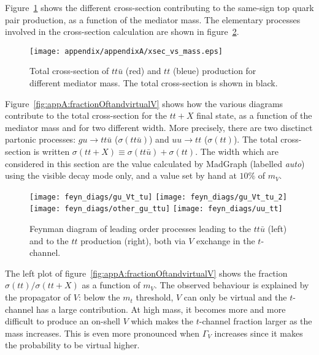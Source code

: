 \label{sec:appA}
       
Figure~\ref{fig:appA:allxsec} shows the different cross-section contributing to the same-sign top quark pair production, as a function of the mediator mass. The elementary processes
involved in the cross-section calculation are shown in figure~\ref{fig:appA:feyn_prod_ss_all}.

\begin{figure}[!h!tpd]
  \centering    
  \texttt{[image: appendix/appendixA/xsec\_vs\_mass.eps]}
  \caption{
    Total cross-section of $tt\bar{u}$ (red) and $tt$ (bleue) production for different mediator mass. The total cross-section is shown in black.
  }
  \label{fig:appA:allxsec}
\end{figure}



Figure~\ref{fig:appA:fractionOftandvirtualV} shows how the various diagrams contribute to the total cross-section for the $tt+X$ final state, 
as a function of the mediator mass and for two different width. More precisely, there are two disctinct partonic 
processes: $gu \to tt\bar{u}$ ($\sigma(tt\bar{u})$) and $uu \to tt$ ($\sigma(tt)$). The total cross-section is written $\sigma(tt+X) \equiv \sigma(tt\bar{u}) + \sigma(tt)$.
The width which are considered in this section are the value calculated by MadGraph (labelled \textit{auto}) using the visible decay mode only, and a value set
by hand at $10\%$ of $m_V$.

\begin{figure}[!h!tpd]
  \centering
  \texttt{[image: feyn\_diags/gu\_Vt\_tu]}     \hspace{0.5cm}
  \texttt{[image: feyn\_diags/gu\_Vt\_tu\_2]}   \hspace{0.8cm}
  \texttt{[image: feyn\_diags/other\_gu\_ttu]} \hspace{1.0cm}
  \texttt{[image: feyn\_diags/uu\_tt]}
  \caption{
    Feynman diagram of leading order processes leading to the $tt\bar{u}$ (left) and to the $tt$ production (right), both via $V$ exchange in the $t$-channel.
  }
  \label{fig:appA:feyn_prod_ss_all}
\end{figure}

The left plot of figure~\ref{fig:appA:fractionOftandvirtualV} shows the fraction $\sigma(tt) / \sigma(tt+X)$ as a function of
$m_V$. The observed behaviour is explained by the propagator of $V$: below the $m_t$ threshold, $V$ can only be virtual and the $t$-channel has a large contribution.
At high mass, it becomes more and more difficult to produce an on-shell $V$ which makes the $t$-channel fraction larger as the mass increases. This is even
more pronounced when $\Gamma_V$ increases since it makes the probability to be virtual higher.

